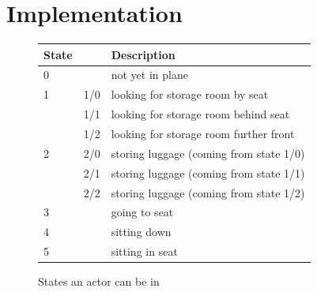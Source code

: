 \documentclass[11pt]{article}
\begin{document}
\section{Implementation}
\begin{figure}[h!]
	\center
\begin{tabular}{|ll|l|}
	\hline
	State & &Description\\
	\hline
0 &     & not yet in plane                        \\
\hline
1 & 1/0 & looking for storage room by seat        \\
  & 1/1 & looking for storage room behind seat    \\
  & 1/2 & looking for storage room further front  \\
  \hline
2 & 2/0 & storing luggage (coming from state 1/0) \\
  & 2/1 & storing luggage (coming from state 1/1) \\
  & 2/2 & storing luggage (coming from state 1/2) \\
  \hline
3 &     & going to seat                           \\
\hline
4 &     & sitting down                            \\
\hline
5 &     & sitting in seat       \\                 
\hline

\end{tabular}
\caption{States an actor can be in}
\label{tab:states}
\end{figure}
\end{document}
